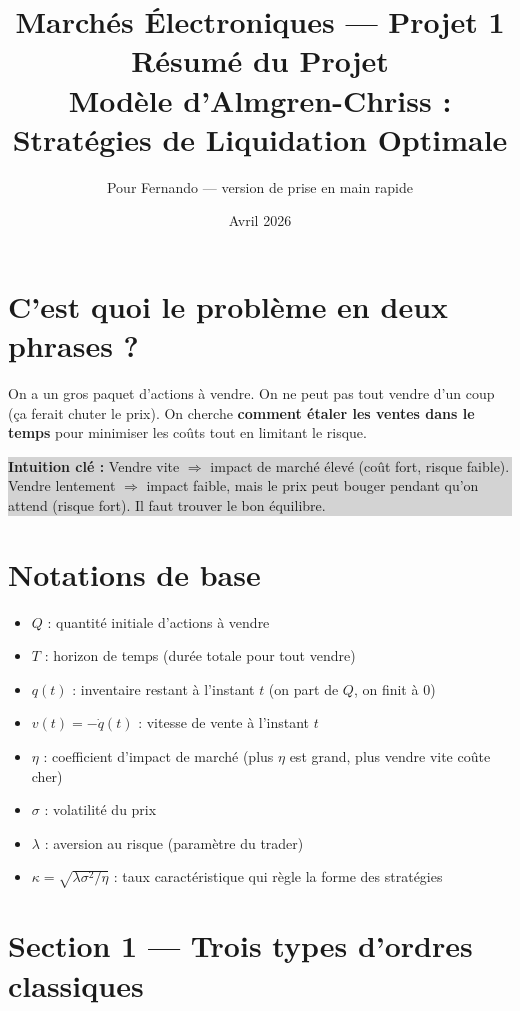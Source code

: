 \documentclass[12pt,a4paper]{article}
\title{
    \vspace{-1cm}
    {\large Marchés Électroniques — Projet 1}\\[0.4em]
    {\LARGE\bfseries\color{mainblue} Résumé du Projet}\\[0.3em]
    {\normalsize Modèle d'Almgren-Chriss : Stratégies de Liquidation Optimale}
}
\author{Pour Fernando — version de prise en main rapide}
\date{Avril 2026}
\begin{document}
\maketitle
\thispagestyle{empty}

\section{C'est quoi le problème en deux phrases ?}

On a un gros paquet d'actions à vendre. On ne peut pas tout vendre d'un coup (ça ferait chuter le prix). On cherche \textbf{comment étaler les ventes dans le temps} pour minimiser les coûts tout en limitant le risque.

\medskip
\colorbox{lightgray}{\parbox{\linewidth}{\small
\textbf{Intuition clé :} Vendre vite $\Rightarrow$ impact de marché élevé (coût fort, risque faible).
Vendre lentement $\Rightarrow$ impact faible, mais le prix peut bouger pendant qu'on attend (risque fort).
Il faut trouver le bon équilibre.
}}

\section{Notations de base}

\begin{itemize}[noitemsep]
    \item $Q$ : quantité initiale d'actions à vendre
    \item $T$ : horizon de temps (durée totale pour tout vendre)
    \item $q(t)$ : inventaire restant à l'instant $t$ (on part de $Q$, on finit à $0$)
    \item $v(t) = -\dot{q}(t)$ : vitesse de vente à l'instant $t$
    \item $\eta$ : coefficient d'impact de marché (plus $\eta$ est grand, plus vendre vite coûte cher)
    \item $\sigma$ : volatilité du prix
    \item $\lambda$ : aversion au risque (paramètre du trader)
    \item $\kappa = \sqrt{\lambda\sigma^2/\eta}$ : taux caractéristique qui règle la forme des stratégies
\end{itemize}

\section{Section 1 — Trois types d'ordres classiques}
\end{document}
